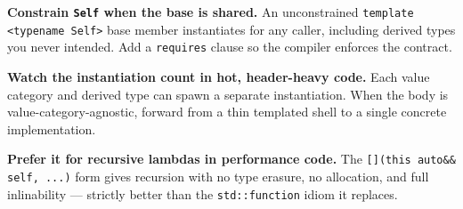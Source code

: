 \textbf{Constrain \lstinline|Self| when the base is shared.} An unconstrained \lstinline|template <typename Self>| base member instantiates for any caller, including derived types you never intended. Add a \lstinline|requires| clause so the compiler enforces the contract.

\textbf{Watch the instantiation count in hot, header-heavy code.} Each value category and derived type can spawn a separate instantiation. When the body is value-category-agnostic, forward from a thin templated shell to a single concrete implementation.

\textbf{Prefer it for recursive lambdas in performance code.} The \lstinline|[](this auto&& self, ...)| form gives recursion with no type erasure, no allocation, and full inlinability --- strictly better than the \lstinline|std::function| idiom it replaces.

